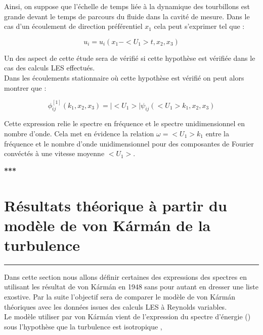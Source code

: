 \documentclass[12pt]{article}
\theoremstyle{plain}
\theoremstyle{remark}
\begin{document}
		Ainsi, on suppose que l'échelle de temps liée à la dynamique des tourbillons est grande devant le temps de parcours du fluide dans la cavité de mesure. Dans le cas d'un écoulement de direction préférentiel $x_1$ cela peut s'exprimer tel que :
		
		\begin{equation}
			u_i=u_i(x_1-<U_1>t,x_2,x_3)
		\end{equation}
	
		Un des aspect de cette étude sera de vérifié si cette hypothèse est vérifiée dans le cas des calculs LES effectués. \\
		
		Dans les écoulements stationnaire où cette hypothèse est vérifié on peut alors montrer que :
		
		\begin{equation}
			\phi_{ij}^{[1]}(k_1,x_2,x_3)=|<U_1>|\psi_{ij}(<U_1>k_1,x_2,x_3)
			\label{fig:turb-fig}
		\end{equation}
	
		Cette expression relie le spectre en fréquence et le spectre unidimensionnel en nombre d'onde. Cela met en évidence la relation $\omega=<U_1>k_1$ entre la fréquence et le nombre d'onde unidimensionnel pour des composantes de Fourier convéctés à une vitesse moyenne $<U_1>$. 
		
		
\begin{center}
	\large {\bf{***}}
\end{center}

\vspace{0.3cm}
\section{Résultats théorique à partir du modèle de von Kármán de la turbulence}
\noindent\rule{\linewidth}{2pt}
\vspace{0.1cm}
		
	Dans cette section nous allons définir certaines des expressions des spectres en utilisant les résultat de von Kármán en 1948 \cite{vonkarman1948} sans pour autant en dresser une liste exostive. Par la suite l'objectif sera de comparer le modèle de von Kármán théoriques avec les données issues des calculs LES à Reynolds variables. \\
	
	Le modèle utiliser par von Kármán vient de l'expression du spectre d'énergie () sous l'hypothèse que la turbulence est isotropique \cite{wilson1998turbulence},
	
\end{document}
